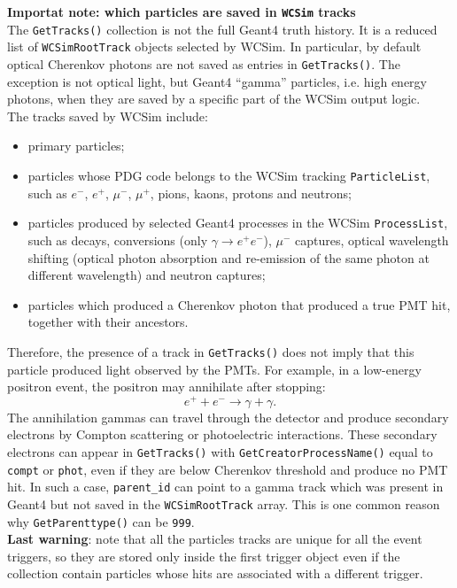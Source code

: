 \documentclass{article}
\numberwithin{table}{subsection}
\numberwithin{figure}{subsection}
\numberwithin{equation}{subsection}
\numberwithin{footnote}{subsection}
\begin{document}
\textbf{Importat note: which particles are saved in \texttt{WCSim} tracks}\\
The \texttt{GetTracks()} collection is not the full Geant4 truth history. It is a reduced list of
\texttt{WCSimRootTrack} objects selected by WCSim. In particular, by default
optical Cherenkov photons are not saved as entries in \texttt{GetTracks()}.
The exception is not optical light, but Geant4 ``gamma'' particles, i.e. high
energy photons, when they are saved by a specific part of the WCSim output
logic.\\
The tracks saved by WCSim include:
\begin{itemize}
    \item primary particles;
    \item particles whose PDG code belongs to the WCSim tracking
    \texttt{ParticleList}, such as \(e^-\), \(e^+\), \(\mu^-\), \(\mu^+\),
    pions, kaons, protons and neutrons;
    \item particles produced by selected Geant4 processes in the WCSim
    \texttt{ProcessList}, such as decays, conversions (only $\gamma\to e^+e^-$), $\mu^-$ captures, optical wavelength shifting (optical photon absorption and re-emission of the same photon at different wavelength) and neutron captures;
    \item particles which produced a Cherenkov photon that produced a true PMT
    hit, together with their ancestors.
\end{itemize}
Therefore, the presence of a track in \texttt{GetTracks()} does not imply that
this particle produced light observed by the PMTs. For example, in a low-energy
positron event, the positron may annihilate after stopping:
\[
    e^+ + e^- \rightarrow \gamma + \gamma .
\]
The annihilation gammas can travel through the detector and produce secondary
electrons by Compton scattering or photoelectric interactions. These secondary
electrons can appear in \texttt{GetTracks()} with
\texttt{GetCreatorProcessName()} equal to \texttt{compt} or \texttt{phot}, even
if they are below Cherenkov threshold and produce no PMT hit. In such a case,
\texttt{parent\_id} can point to a gamma track which was present in Geant4 but
not saved in the \texttt{WCSimRootTrack} array. This is one common reason why
\texttt{GetParenttype()} can be \texttt{999}.\\
\newline
\textbf{Last warning}: note that all the particles tracks are unique for all the event triggers, so they are stored only inside the first trigger object even if the collection contain particles whose hits are associated with a different trigger.
\end{document}
